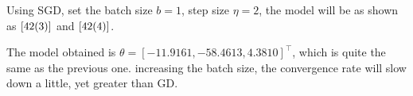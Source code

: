 \documentclass[a4paper,12pt]{article}
\begin{document}
\begin{figure}[htbp]
\setcounter{subfigure}{8}
\centering
{}
\end{figure}

Using SGD, set the batch size $b = 1$, step size $ \eta = 2 $,  the model will be as shown as $\ref{42(3)}$ and $\ref{42(4)}$.

The model obtained is $\theta = [ -11.9161, -58.4613, 4.3810]^{\top}$, which is quite the same as the previous one. increasing the batch size, the convergence rate will slow down a little, yet greater than GD.

\begin{figure}[htbp]
\setcounter{subfigure}{10}
\centering
{}
\end{figure}
\end{document}
